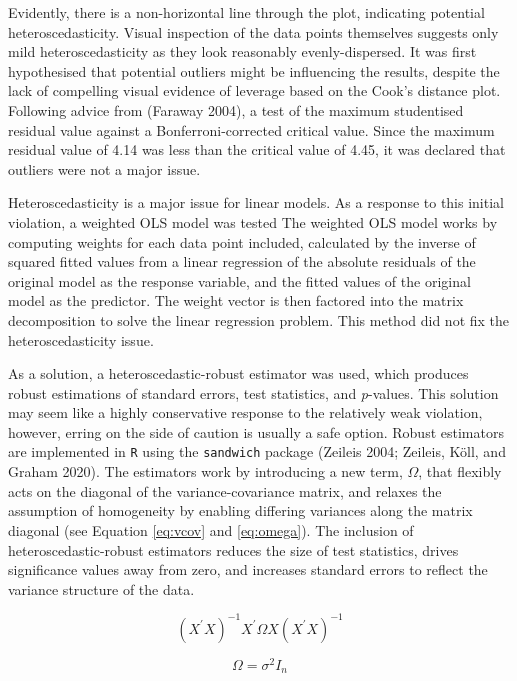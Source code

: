 \documentclass{article}
\begin{document}
Evidently, there is a non-horizontal line through the plot, indicating potential heteroscedasticity. Visual inspection of the data points themselves suggests only mild heteroscedasticity as they look reasonably evenly-dispersed. It was first hypothesised that potential outliers might be influencing the results, despite the lack of compelling visual evidence of leverage based on the Cook's distance plot. Following advice from (Faraway 2004), a test of the maximum studentised residual value against a Bonferroni-corrected critical value. Since the maximum residual value of 4.14 was less than the critical value of 4.45, it was declared that outliers were not a major issue.

Heteroscedasticity is a major issue for linear models. As a response to this initial violation, a weighted OLS model was tested The weighted OLS model works by computing weights for each data point included, calculated by the inverse of squared fitted values from a linear regression of the absolute residuals of the original model as the response variable, and the fitted values of the original model as the predictor. The weight vector is then factored into the matrix decomposition to solve the linear regression problem. This method did not fix the heteroscedasticity issue.

As a solution, a heteroscedastic-robust estimator was used, which produces robust estimations of standard errors, test statistics, and \emph{p}-values. This solution may seem like a highly conservative response to the relatively weak violation, however, erring on the side of caution is usually a safe option. Robust estimators are implemented in \texttt{R} using the \texttt{sandwich} package (Zeileis 2004; Zeileis, Köll, and Graham 2020). The estimators work by introducing a new term, \(\Omega\), that flexibly acts on the diagonal of the variance-covariance matrix, and relaxes the assumption of homogeneity by enabling differing variances along the matrix diagonal (see Equation \eqref{eq:vcov} and \eqref{eq:omega}). The inclusion of heteroscedastic-robust estimators reduces the size of test statistics, drives significance values away from zero, and increases standard errors to reflect the variance structure of the data.

\begin{equation}
(X^{'}X)^{-1}X^{'}\Omega X (X^{'}X)^{-1} \label{eq:vcov}
\end{equation}

\begin{equation}
\Omega = \sigma^{2}I_{n} \label{eq:omega}
\end{equation}
\end{document}
